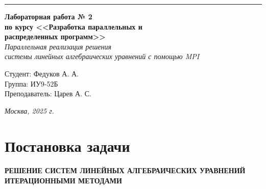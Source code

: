 \documentclass[a4paper, 14pt]{extarticle}
\begin{document}
\begin{titlepage}
\vspace*{-16pt}
\hspace{30pt}\rule{0.866\textwidth}{0.4pt}
  
\vspace{11em}

\begin{center}
\Large {\bf Лабораторная работа № 2} \\ 
\large {\bf по курсу <<Разработка параллельных и \\ распределенных программ>>} \\
\textit{Параллельная реализация решения \\ системы линейных алгебраических уравнений с помощью MPI}

\end{center}\normalsize

\vspace{8em}


\begin{flushright}
 \begin{minipage}{0.5\linewidth}
      {Студент: Федуков А. А. \hspace*{15pt}\\ 
      Группа: ИУ9-52Б \\ 
      Преподаватель: Царев А. С. \hspace*{15pt}}
  \end{minipage}
\end{flushright}
\bigskip
\vfill
\begin{center}
\textsl{Москва, 2025 г.}
\end{center}
\end{titlepage}

\renewcommand{\ttdefault}{pcr}

\setlength{\tabcolsep}{3pt}
\newpage
\setcounter{page}{2}

{
  \hypersetup{linkcolor=black}
  \tableofcontents
}


\section*{Постановка задачи}\label{Sect::goal}
\paragraph{РЕШЕНИЕ СИСТЕМ ЛИНЕЙНЫХ АЛГЕБРАИЧЕСКИХ УРАВНЕНИЙ ИТЕРАЦИОННЫМИ МЕТОДАМИ}
\end{document}
